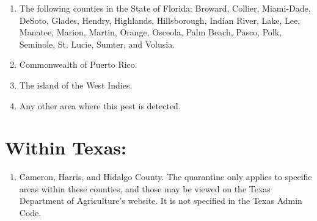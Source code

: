 \documentclass[12pt]{exam}
\begin{document}
\begin{enumerate}
\item The following counties in the State of Florida: Broward, Collier, Miami-Dade, DeSoto, Glades, Hendry, Highlands, Hillsborough, Indian River, Lake, Lee, Manatee, Marion, Martin, Orange, Osceola, Palm Beach, Pasco, Polk, Seminole, St. Lucie, Sumter, and Volusia.
\item Commonwealth of Puerto Rico.
\item The island of the West Indies.
\item Any other area where this pest is detected.
\end{enumerate}

\section{Within Texas:}
\begin{enumerate}
\item Cameron, Harris, and Hidalgo County. The quarantine only applies to specific areas within these counties, and those may be viewed on the Texas Department of Agriculture's website. It is not specified in the Texas Admin Code.
\end{enumerate}
\newpage
\end{document}
